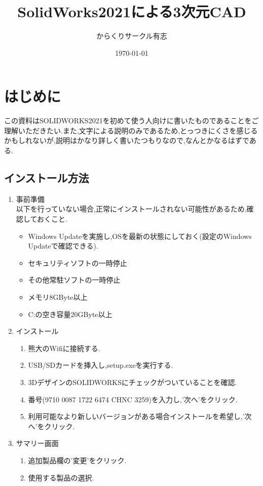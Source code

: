 \documentclass[a4paper,11pt]{jsarticle}
\title{SolidWorks2021による3次元CAD}
\author{からくりサークル有志}
\date{\today}
\begin{document}
\maketitle
\clearpage
\tableofcontents
\clearpage

\section{はじめに}
この資料はSOLIDWORKS2021を初めて使う人向けに書いたものであることをご理解いただきたい.また,文字による説明のみであるため,とっつきにくさを感じるかもしれないが,説明はかなり詳しく書いたつもりなので,なんとかなるはずである.
\subsection{インストール方法}
\begin{enumerate}
 \item 事前準備\\
 以下を行っていない場合,正常にインストールされない可能性があるため,確認しておくこと.
 \begin{itemize}
  \item Windows Updateを実施し,OSを最新の状態にしておく(設定のWindows Updateで確認できる).
  \item セキュリティソフトの一時停止
  \item その他常駐ソフトの一時停止
  \item メモリ8GByte以上
  \item C:の空き容量20GByte以上
 \end{itemize}
 \item インストール
 \begin{enumerate}
  \item 熊大のWifiに接続する.
  \item USB/SDカードを挿入し,setup.exeを実行する.
  \item 3DデザインのSOLIDWORKSにチェックがついていることを確認.
  \item 番号(9710  0087  1722  6474  CHNC  3259)を入力し,'次へ'をクリック.
  \item 利用可能なより新しいバージョンがある場合インストールを希望し,'次へ'をクリック.
 \end{enumerate}
 \item サマリー画面
 \begin{enumerate}
  \item 追加製品欄の'変更'をクリック.
  \item 使用する製品の選択.
  \begin{itemize}

\end{itemize}
\end{enumerate}
\end{enumerate}
\end{document}
